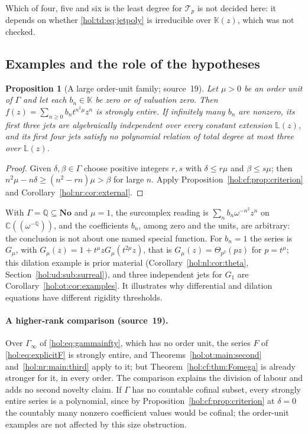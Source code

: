 \documentclass[11pt]{article}
\numberwithin{equation}{section}
\newtheorem{proposition}[theorem]{Proposition}
\theoremstyle{definition}
\theoremstyle{remark}
\newcommand{\C}{\mathbb C}
\newcommand{\Q}{\mathbb Q}
\newcommand{\No}{\mathbf{No}}
\newcommand{\KK}{\mathbb K}
\begin{document}
Which of four, five and six is the least degree for $\mathcal T_p$ is not
decided here: it depends on whether \eqref{hol:td:eq:jetpoly} is irreducible
over $\KK(z)$, which was not checked.

\subsection{Examples and the role of the hypotheses}
\label{hol:nr:sub:examples}

\begin{proposition}[A large order-unit family; source~19]
\label{hol:nr:prop:family}
Let $\mu>0$ be an order unit of $\Gamma$ and let each $b_n\in\KK$ be zero or
of valuation zero. Then $f(z)=\sum_{n\ge0}b_nt^{n^2\mu}z^n$ is strongly entire.
If infinitely many $b_n$ are nonzero, its first three jets are algebraically
independent over every constant extension $\mathbb L(z)$, and its first four
jets satisfy no polynomial relation of total degree at most three over
$\mathbb L(z)$.
\end{proposition}

\begin{proof}
Given $\delta,\beta\in\Gamma$ choose positive integers $r,s$ with $\delta\le
r\mu$ and $\beta\le s\mu$; then $n^2\mu-n\delta\ge(n^2-rn)\mu>\beta$ for large
$n$. Apply Proposition~\ref{hol:cf:prop:criterion} and
Corollary~\ref{hol:nr:cor:external}.
\end{proof}

With $\Gamma=\Q\subseteq\No$ and $\mu=1$, the surcomplex reading is
$\sum_nb_n\omega^{-n^2}z^n$ on $\C((\omega^{-\Q}))$, and the coefficients
$b_n$, among zero and the units, are arbitrary: the conclusion is not about
one named special function. For $b_n=1$ the series is $G_\mu$, with
$G_\mu(z)=1+t^\mu zG_\mu(t^{2\mu}z)$, that is $G_\mu(z)=\Theta_{p^2}(pz)$ for
$p=t^\mu$; this dilation example is prior material
(Corollary~\ref{hol:nl:cor:theta}, Section~\ref{hol:ud:sub:surreal}), and
three independent jets for $G_1$ are Corollary~\ref{hol:ot:cor:examples}. It
illustrates why differential and dilation equations have different rigidity
thresholds.

\paragraph{A higher-rank comparison (source~19).}
Over $\Gamma_\infty$ of \eqref{hol:eq:gammainfty}, which has no order unit, the
series $F$ of \eqref{hol:eq:explicitF} is strongly entire, and
Theorems~\ref{hol:ot:main:second} and~\ref{hol:nr:main:third} apply to it; but
Theorem~\ref{hol:cf:thm:Fomega} is already stronger for it, in every order.
The comparison explains the division of labour and adds no second novelty
claim. If $\Gamma$ has no countable cofinal subset, every strongly entire
series is a polynomial, since by Proposition~\ref{hol:cf:prop:criterion} at
$\delta=0$ the countably many nonzero coefficient values would be cofinal;
the order-unit examples are not affected by this size obstruction.
\end{document}
